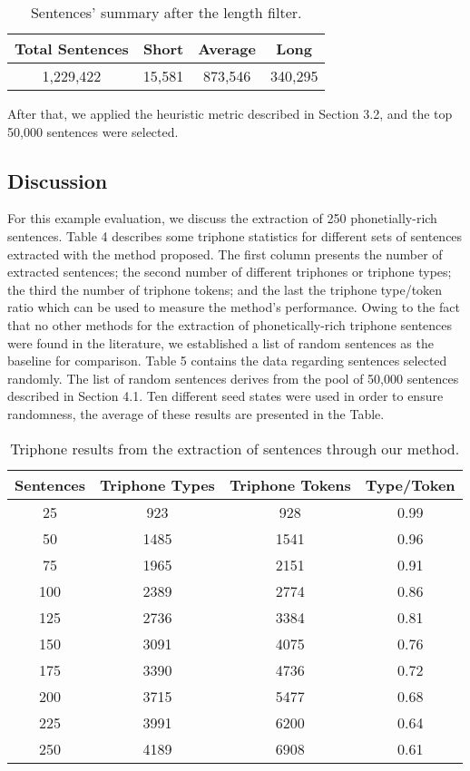 \begin{table}[H]
\begin{center}
\begin{tabular}{|c|c|c|c|}
\hline
\textbf{Total Sentences} & \textbf{Short} & \textbf{Average} & \textbf{Long} \\ \hline
1,229,422 & 15,581 & 873,546 & 340,295 \\ \hline
\end{tabular}
\end{center}
\caption{\label{filtered-sent} Sentences' summary after the length filter.}
\end{table}

After that, we applied the heuristic metric described in Section 3.2, and the top 50,000 sentences were selected.

\clearpage
\subsection{Discussion}

For this example evaluation, we discuss the extraction of 250 phonetially-rich sentences. Table 4 describes some triphone statistics for different sets of sentences extracted with the method proposed. The first column presents the number of extracted sentences; the second number of different triphones or triphone types; the third the number of triphone tokens; and the last the triphone type/token ratio which can be used to measure the method's performance. 
Owing to the fact that no other methods for the extraction of phonetically-rich triphone sentences were found in the literature,
we established a list of random sentences as the baseline for comparison. Table 5 contains the data regarding sentences selected randomly. The list of random sentences derives from the pool of 
50,000 sentences described in Section 4.1. Ten different seed states were used in order to ensure
randomness, the average of these results are presented in the Table. 

\begin{table}[H]
\begin{center}
\begin{tabular}{|c|c|c|c|}
\hline
Sentences & Triphone Types & Triphone Tokens & Type/Token \\ \hline
25 & 923 & 928 & 0.99 \\
50 & 1485 & 1541 & 0.96 \\
75 & 1965 & 2151 & 0.91 \\
100 & 2389 & 2774 & 0.86 \\
125 & 2736 & 3384 & 0.81 \\
150 & 3091 & 4075 & 0.76 \\
175 & 3390 & 4736 & 0.72 \\
200 & 3715 & 5477 & 0.68 \\
225 & 3991 & 6200 & 0.64 \\
250 & 4189 & 6908 & 0.61 \\ \hline
\end{tabular}
\end{center}
\caption{\label{results-tri-extracted} Triphone results from the extraction of sentences through our method.}
\end{table}

